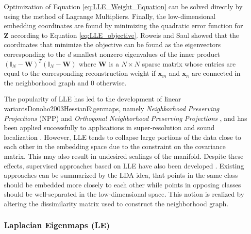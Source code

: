 \noindent
Optimization of Equation \ref{eq:LLE_Weight_Equation} can be solved directly by using the method of Lagrange Multipliers. Finally, the low-dimensional embedding coordinates are found by minimizing the quadratic error function for $\bm{Z}$ according to Equation \ref{eq:LLE_objective}.  Roweis and Saul \cite{Roweis2000LLE} showed that the coordinates that minimize the objective can be found as the eigenvectors corresponding to the $d$ smallest nonzero eigenvalues of the inner product $(\bm{\mathbb{I}}_{N}-\bm{W})^{T}(\bm{\mathbb{I}}_{N}-\bm{W})$ where $\bm{W}$ is a $N \times N$ sparse matrix whose entries are equal to the corresponding reconstruction weight if $\bm{x}_{m}$ and $\bm{x}_{n}$ are connected in the neighborhood graph and $0$ otherwise.

The popularity of LLE has led to the development of linear variantsDonoho2003HessianEigenmaps, namely \textit{Neighborhood Preserving Projections} (NPP) and \textit{Orthogonal Neighborhood Preserving Projections} \citep{Pang2005NPP,Kokiopoulou2007OrthoNPP}, and has been applied successfully to applications in super-resolution and sound localization \citep{VanDerMaaten2009DRReview}.  However, LLE tends to collapse large portions of the data close to each other in the embedding space due to the constraint on the covariance matrix.  This may also result in undesired scalings of the manifold.  Despite these effects, supervised approaches based on LLE have also been developed \citep{Chao2019RecentAdvancesSupervisedDimRed,Li2009SupManifoldLearning}.  Existing approaches can be summarized by the LDA idea, that points in the same class should be embedded more closely to each other while points in opposing classes should be well-separated in the low-dimensional space.  This notion is realized by altering the dissimilarity matrix used to construct the neighborhood graph.     


\subsubsection{Laplacian Eigenmaps (LE)} \label{sec:Laplacian_Eigenmaps}
